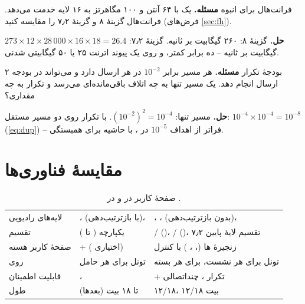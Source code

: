 \documentclass[11pt,a4paper]{article}
\begin{document}
\begin{examplebox}{فرانت‌هال برای  انبوه}\label{ex:fh}
\textbf{مسئله.} یک  با ۶۴ آنتن و ۱۰۰ مگاهرتز به ۱۶ لایه خدمت می‌دهد. فرانت‌هال گزینهٔ ۸ و گزینهٔ ۷٫۲ را مقایسه کنید (فرض‌های \cref{sec:fh}).

\textbf{حل.} گزینهٔ ۸: ۲۶۰ گیگابیت بر ثانیه. گزینهٔ ۷٫۲: $273\times12\times28\,000\times16\times18 = 26.4$ گیگابیت بر ثانیه -- ده برابر کمتر، و
روی یک پیوند اترنت ۲۵ یا ۵۰ گیگابیتی شدنی.
\end{examplebox}

\begin{examplebox}{بودجهٔ تکرار}\label{ex:dup}
\textbf{مسئله.} هر مسیر  برابر $10^{-2}$ در هر ارسال دارد و می‌تواند در بودجه ۲ ارسال انجام دهد. یک مسیر تنها به چه اتلاف باقی‌مانده‌ای
می‌رسد و تکرار به چه مقداری؟

\textbf{حل.} مسیر تنها: $(10^{-2})^2 = 10^{-4}$. با تکرار روی دو مسیر مستقل: $10^{-4}\times10^{-4} = 10^{-8}$ (\cref{eq:dup}) -- فراتر از اهداف
$10^{-5}$ در ، با حاشیه برای همبستگی.
\end{examplebox}

\section{مقایسهٔ فناوری‌ها}
\begin{table}[htbp]
\centering\small
\caption{صفحهٔ کاربر در  و در .}\label{tab:cmp}
\begin{tabularx}{\linewidth}{@{}l Y Y@{}}
\toprule
{} &  &  \\
\midrule
لایه‌های رادیویی   & ،  (با بازترتیب‌دهی)،  & ، ،  (بدون بازترتیب‌دهی)،  \\
تقسیم     &  یکپارچه ( تا ) & / ()، / ()، تقسیم لایهٔ پایین ۷٫۲ \\
صفحهٔ کاربر هسته    &  +  ( اختیاری) & زنجیرهٔ ها (، ، ) با کنترل  \\
 روی  & تونل برای هر حامل & تونل برای هر نشست،  برای هر بسته \\
قابلیت اطمینان      & ،  & + تکرار ، چنداتصالی \\
طول        &  تا ۱۸ بیت (بعدها) &  ۱۲/۱۸،  ۱۲/۱۸ بیت \\
\bottomrule
\end{tabularx}
\end{table}
\end{document}

